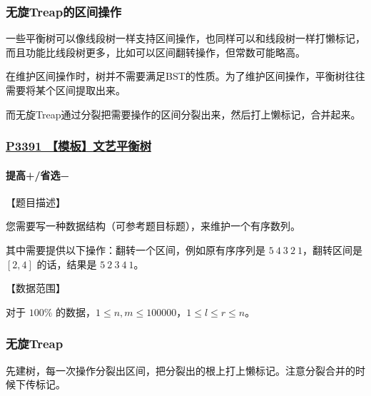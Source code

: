 \documentclass[utf8]{ctexbeamer}
\begin{document}
    \begin{frame}
        \frametitle{无旋Treap的区间操作}
        一些平衡树可以像线段树一样支持区间操作，也同样可以和线段树一样打懒标记，而且功能比线段树更多，比如可以区间翻转操作，但常数可能略高。

        在维护区间操作时，树并不需要满足BST的性质。为了维护区间操作，平衡树往往需要将某个区间提取出来。

        而无旋Treap通过分裂把需要操作的区间分裂出来，然后打上懒标记，合并起来。
    \end{frame}

    \begin{frame}
        \frametitle{\href{https://www.luogu.com.cn/problem/P3391}{P3391 【模板】文艺平衡树}}
        \framesubtitle{\textcolor[RGB]{52, 152, 219}{提高+/省选−}}        
        【题目描述】

        您需要写一种数据结构（可参考题目标题），来维护一个有序数列。  

        其中需要提供以下操作：翻转一个区间，例如原有序序列是 $5\ 4\ 3\ 2\ 1$，翻转区间是 $[2,4]$ 的话，结果是 $5\ 2\ 3\ 4\ 1$。

        【数据范围】  

        对于 $100\%$ 的数据，$1 \le n, m \leq 100000 $，$1 \le l \le r \le n$。
    \end{frame}

    \begin{frame}
        \frametitle{无旋Treap}
        先建树，每一次操作分裂出区间，把分裂出的根上打上懒标记。注意分裂合并的时候下传标记。    
    \end{frame}
\end{document}
